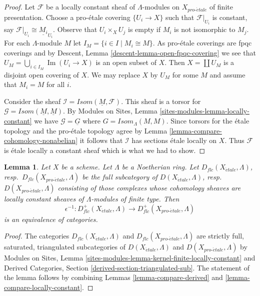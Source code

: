 \documentclass{stacks-project}
\theoremstyle{plain}
\newtheorem{lemma}[subsection]{Lemma}
\theoremstyle{definition}
\theoremstyle{remark}
\numberwithin{equation}{subsection}
\def\proetale{{pro\text{-}\acute{e}tale}}
\def\etale{{\acute{e}tale}}
\def\Im{\mathop{\mathrm{Im}}}
\begin{document}
\begin{proof}
Let $\mathcal{F}$ be a locally constant sheaf of $\Lambda$-modules
on $X_\proetale$ of finite presentation. Choose a pro-\'etale covering
$\{U_i \to X\}$ such that $\mathcal{F}|_{U_i}$ is constant, say
$\mathcal{F}|_{U_i} \cong \underline{M_i}_{U_i}$.
Observe that $U_i \times_X U_j$ is empty if $M_i$ is not isomorphic
to $M_j$.
For each $\Lambda$-module $M$ let $I_M = \{i \in I \mid M_i \cong M\}$.
As pro-\'etale coverings are fpqc coverings and by
Descent, Lemma \ref{descent-lemma-open-fpqc-covering}
we see that $U_M = \bigcup_{i \in I_M} \Im(U_i \to X)$
is an open subset of $X$. Then $X = \coprod U_M$ is a disjoint
open covering of $X$. We may replace $X$ by $U_M$ for some $M$ and
assume that $M_i = M$ for all $i$.

\medskip\noindent
Consider the sheaf $\mathcal{I} = \mathit{Isom}(\underline{M}, \mathcal{F})$.
This sheaf is a torsor for
$\mathcal{G} = \mathit{Isom}(\underline{M}, \underline{M})$.
By Modules on Sites, Lemma \ref{sites-modules-lemma-locally-constant}
we have $\mathcal{G} = \underline{G}$
where $G = \mathit{Isom}_\Lambda(M, M)$.
Since torsors for the \'etale topology
and the pro-\'etale topology agree by
Lemma \ref{lemma-compare-cohomology-nonabelian}
it follows that $\mathcal{I}$ has sections \'etale locally on $X$.
Thus $\mathcal{F}$ is \'etale locally a constant sheaf which is
what we had to show.
\end{proof}

\begin{lemma}
\label{lemma-compare-locally-constant-derived}
Let $X$ be a scheme. Let $\Lambda$ be a Noetherian ring.
Let $D_{flc}(X_\etale, \Lambda)$, resp.\ $D_{flc}(X_\proetale, \Lambda)$
be the full subcategory of
$D(X_\etale, \Lambda)$, resp.\ $D(X_\proetale, \Lambda)$
consisting of those complexes whose cohomology sheaves are locally
constant sheaves of $\Lambda$-modules of finite type. Then
$$
\epsilon^{-1} :
D_{flc}^+(X_\etale, \Lambda)
\longrightarrow
D_{flc}^+(X_\proetale, \Lambda)
$$
is an equivalence of categories.
\end{lemma}

\begin{proof}
The categories $D_{flc}(X_\etale, \Lambda)$ and $D_{flc}(X_\proetale, \Lambda)$
are strictly full, saturated, triangulated subcategories of
$D(X_\etale, \Lambda)$ and $D(X_\proetale, \Lambda)$
by Modules on Sites, Lemma
\ref{sites-modules-lemma-kernel-finite-locally-constant}
and
Derived Categories, Section \ref{derived-section-triangulated-sub}.
The statement of the lemma follows by combining
Lemmas \ref{lemma-compare-derived} and
\ref{lemma-compare-locally-constant}.
\end{proof}
\end{document}
